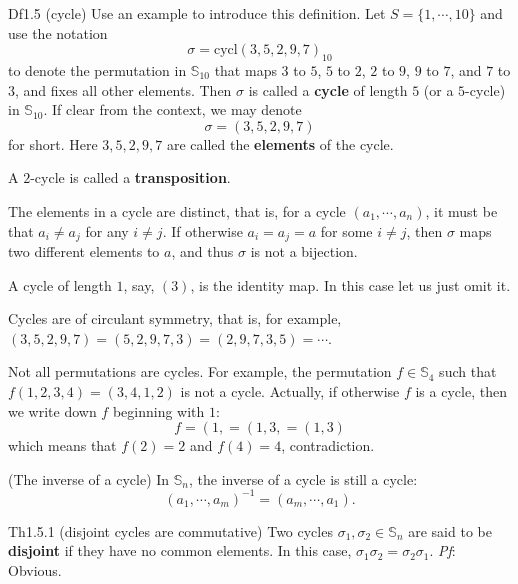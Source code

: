 \documentclass{article}
\newcommand{\cycl}{\text{cycl}}
\begin{document}
\begin{Df}{Df1.5 (cycle)}
    Use an example to introduce this definition. Let $S = \{1, \cdots, 10\}$ and use the notation
    $$ \sigma = \cycl (3, 5, 2, 9, 7)_{10} $$
    to denote the permutation in $\mathbb{S}_{10}$ that maps $3$ to $5$, $5$ to $2$, $2$ to $9$, $9$ to $7$, and $7$ to $3$, and fixes all other elements. Then $\sigma$ is called a \textbf{cycle} of length $5$ (or a $5$-cycle) in $\mathbb{S}_{10}$. If clear from the context, we may denote
    $$ \sigma = (3, 5, 2, 9, 7) $$
    for short. Here $3, 5, 2, 9, 7$ are called the \textbf{elements} of the cycle.
\end{Df}

\begin{Rmk}{}
    \begin{compactenum}
        \item \textcolor{Df}{A $2$-cycle is called a \textbf{transposition}.} 
        \item \textcolor{Th}{The elements in a cycle are distinct,} that is, for a cycle $(a_1, \cdots, a_n)$, it must be that $a_i\neq a_j$ for any $i\neq j$. If otherwise $a_i=a_j=a$ for some $i\neq j$, then $\sigma$ maps two different elements to $a$, and thus $\sigma$ is not a bijection.
        \item \textcolor{Th}{A cycle of length $1$, say, $(3)$, is the identity map.} \textcolor{Df}{In this case let us just omit it}.
        \item \textcolor{Th}{Cycles are of circulant symmetry, that is, for example, $(3, 5, 2, 9, 7) = (5, 2, 9, 7, 3) = (2, 9, 7, 3, 5) = \cdots$.}
        \item \textcolor{Th}{Not all permutations are cycles.} For example, the permutation $f\in\mathbb{S}_4$ such that $f(1,2,3,4) = (3,4,1,2)$ is not a cycle. Actually, if otherwise $f$ is a cycle, then we write down $f$ beginning with $1$:
        $$ f = \left(1, \right. = \left(1, 3, \right. = \left(1, 3\right) $$
        which means that $f(2) = 2$ and $f(4) = 4$, contradiction.
        \item \textcolor{Th}{(The inverse of a cycle) In $\mathbb{S}_n$, the inverse of a cycle is still a cycle:
        $$ (a_1, \cdots, a_m)^{-1} = (a_m, \cdots, a_1). $$}
    \end{compactenum}
\end{Rmk}

\begin{Th}{Th1.5.1 (disjoint cycles are commutative)}
    \textcolor{Df}{Two cycles $\sigma_1, \sigma_2\in\mathbb{S}_n$ are said to be \textbf{disjoint} if they have no common elements.} In this case, $\sigma_1\sigma_2 = \sigma_2\sigma_1$.
    \tcblower
    \textit{Pf}: Obvious.
\end{Th}
\end{document}

